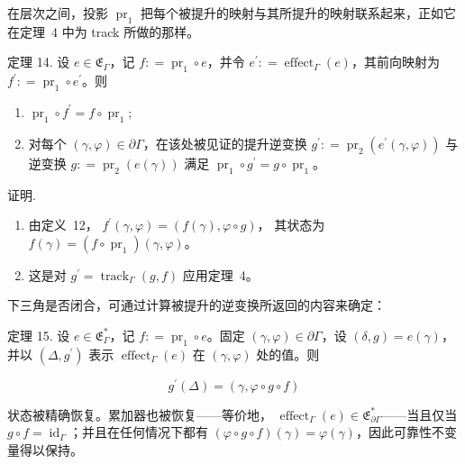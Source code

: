 \documentclass[
  10
]{article}
\begin{document}
在层次之间，投影 \(\operatorname { p r } _ { 1 }\) 把每个被提升的映射与其所提升的映射联系起来，正如它在定理~4 中为 track 所做的那样。

定理 14. 设 \(e \in \mathfrak { E } _ { \Gamma }\)，记 \(f : = \operatorname { p r } _ { 1 } \circ e\)，并令
\(e ^ { \prime } : = \operatorname { e f f e c t } _ { \Gamma } ( e )\)，其前向映射为
\(f ^ { \prime } : = \operatorname { p r } _ { 1 } \circ e ^ { \prime }\)。则

\begin{enumerate}
\def\labelenumi{\arabic{enumi}.}
\item
  \(\operatorname { p r } _ { 1 } \circ f ^ { \prime } = f \circ \operatorname { p r } _ { 1 } ;\)
\item
  对每个 \(( \gamma , \varphi ) \in \partial \Gamma\)，在该处被见证的提升逆变换
  \(g ^ { \prime } : = \operatorname { p r } _ { 2 } ( e ^ { \prime } ( \gamma , \varphi ) )\) 与逆变换
  \(g : = \operatorname { p r } _ { 2 } ( e ( \gamma ) )\) 满足
  \(\operatorname { p r } _ { 1 } \circ g ^ { \prime } = g \circ \operatorname { p r } _ { 1 }\)。
\end{enumerate}

证明.

\begin{enumerate}
\def\labelenumi{\arabic{enumi}.}
\item
  由定义~12，
  \(f ^ { \prime } ( \gamma , \varphi ) = ( f ( \gamma ) , \varphi \circ g )\)，
  其状态为
  \(f ( \gamma ) = ( f \circ \operatorname { p r } _ { 1 } ) ( \gamma , \varphi )\)。
\item
  这是对 \(g ^ { \prime } = \operatorname { t r a c k } _ { \Gamma } ( g , f )\) 应用定理~4。
\end{enumerate}

下三角是否闭合，可通过计算被提升的逆变换所返回的内容来确定：

定理 15. 设 \(e \in \mathfrak { E } _ { \Gamma } ^ { * }\)，记 \(f : = \operatorname { p r } _ { 1 } \circ e\)。固定
\(( \gamma , \varphi ) \in \partial \Gamma\)，设 \(( \delta , g ) = e ( \gamma )\)，并以
\(( \Delta , g ^ { \prime } )\) 表示 \(\operatorname { e f f e c t } _ { \Gamma } ( e )\) 在
\(( \gamma , \varphi )\) 处的值。则

\[
g ^ { \prime } ( \Delta ) = ( \gamma , \varphi \circ g \circ f )\tag{16}
\]

状态被精确恢复。累加器也被恢复——等价地，
\(\operatorname { e f f e c t } _ { \Gamma } ( e ) \in \mathfrak { E } _ { \partial \Gamma } ^ { * }\)——当且仅当
\(g \circ f = \operatorname { i d } _ { \Gamma }\)；并且在任何情况下都有
\(( \varphi \circ g \circ f ) ( \gamma ) = \varphi ( \gamma )\)，因此可靠性不变量得以保持。
\end{document}
